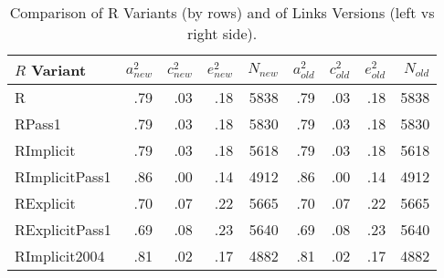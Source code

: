 \documentclass{article}\usepackage{graphicx, color}
\begin{document}
\begin{table}[ht]
\begin{center}
{\large
\begin{tabular}{l|rrrr|rrrr}
  \hline
$R$ Variant & $a_{new}^2$ & $c_{new}^2$ & $e_{new}^2$ & $N_{new}$ & $a_{old}^2$ & $c_{old}^2$ & $e_{old}^2$ & $N_{old}$ \\ 
  \hline
R & .79 & .03 & .18 & 5838 & .79 & .03 & .18 & 5838 \\ 
  RPass1 & .79 & .03 & .18 & 5830 & .79 & .03 & .18 & 5830 \\ 
  RImplicit & .79 & .03 & .18 & 5618 & .79 & .03 & .18 & 5618 \\ 
  RImplicitPass1 & .86 & .00 & .14 & 4912 & .86 & .00 & .14 & 4912 \\ 
  RExplicit & .70 & .07 & .22 & 5665 & .70 & .07 & .22 & 5665 \\ 
  RExplicitPass1 & .69 & .08 & .23 & 5640 & .69 & .08 & .23 & 5640 \\ 
  RImplicit2004 & .81 & .02 & .17 & 4882 & .81 & .02 & .17 & 4882 \\ 
   \hline
\end{tabular}
}
\caption{Comparison of R Variants (by rows) and of Links Versions (left vs right side).}
\end{center}
\end{table}
\end{document}
